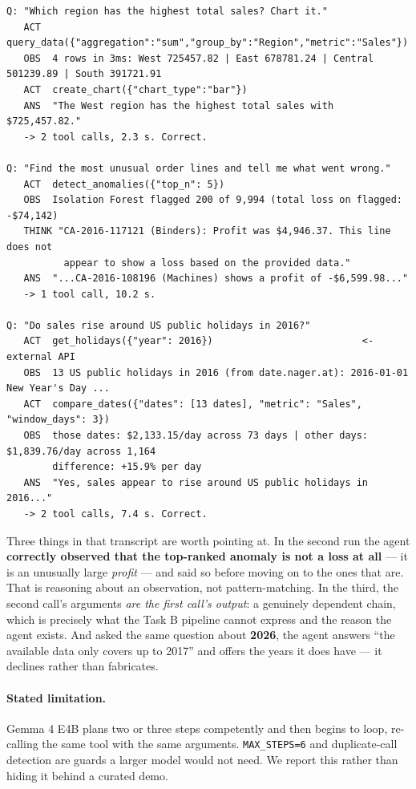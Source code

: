 \documentclass[11pt,a4paper]{article}
\begin{document}
\begin{lstlisting}
Q: "Which region has the highest total sales? Chart it."
   ACT  query_data({"aggregation":"sum","group_by":"Region","metric":"Sales"})
   OBS  4 rows in 3ms: West 725457.82 | East 678781.24 | Central 501239.89 | South 391721.91
   ACT  create_chart({"chart_type":"bar"})
   ANS  "The West region has the highest total sales with $725,457.82."
   -> 2 tool calls, 2.3 s. Correct.

Q: "Find the most unusual order lines and tell me what went wrong."
   ACT  detect_anomalies({"top_n": 5})
   OBS  Isolation Forest flagged 200 of 9,994 (total loss on flagged: -$74,142)
   THINK "CA-2016-117121 (Binders): Profit was $4,946.37. This line does not
          appear to show a loss based on the provided data."
   ANS  "...CA-2016-108196 (Machines) shows a profit of -$6,599.98..."
   -> 1 tool call, 10.2 s.

Q: "Do sales rise around US public holidays in 2016?"
   ACT  get_holidays({"year": 2016})                          <- external API
   OBS  13 US public holidays in 2016 (from date.nager.at): 2016-01-01 New Year's Day ...
   ACT  compare_dates({"dates": [13 dates], "metric": "Sales", "window_days": 3})
   OBS  those dates: $2,133.15/day across 73 days | other days: $1,839.76/day across 1,164
        difference: +15.9% per day
   ANS  "Yes, sales appear to rise around US public holidays in 2016..."
   -> 2 tool calls, 7.4 s. Correct.
\end{lstlisting}

Three things in that transcript are worth pointing at. In the second run the agent
\textbf{correctly observed that the top-ranked anomaly is not a loss at all} --- it is
an unusually large \emph{profit} --- and said so before moving on to the ones that are.
That is reasoning about an observation, not pattern-matching. In the third, the second
call's arguments \emph{are the first call's output}: a genuinely dependent chain, which
is precisely what the Task B pipeline cannot express and the reason the agent exists.
And asked the same question about \textbf{2026}, the agent answers ``the available data
only covers up to 2017'' and offers the years it does have --- it declines rather than
fabricates.

\paragraph{Stated limitation.} Gemma 4 E4B plans two or three steps competently and then
begins to loop, re-calling the same tool with the same arguments. \texttt{MAX\_STEPS=6}
and duplicate-call detection are guards a larger model would not need. We report this
rather than hiding it behind a curated demo.
\end{document}
